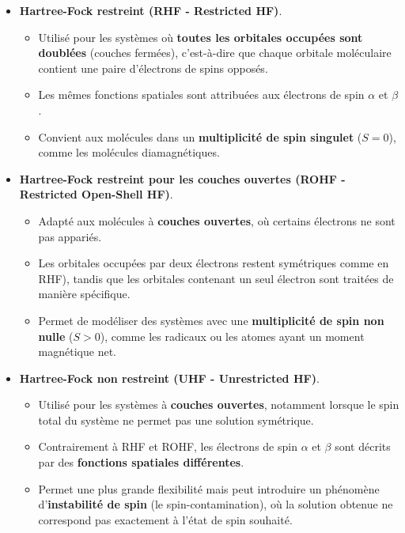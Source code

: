 \documentclass[12pt,a4paper]{article} %
\numberwithin{equation}{section} %
\numberwithin{figure}{section} %
\numberwithin{table}{section} %
\begin{document}
\begin{itemize}
    \item \textbf{Hartree-Fock restreint (RHF - Restricted HF)}.
    \begin{itemize}
        \item Utilisé pour les systèmes où \textbf{toutes les orbitales occupées sont doublées} (couches fermées), c’est-à-dire que chaque orbitale moléculaire contient une paire d’électrons de spins opposés.
        
        \item Les mêmes fonctions spatiales sont attribuées aux électrons de spin $\alpha$ et $\beta$.
        
        \item Convient aux molécules dans un \textbf{multiplicité de spin singulet} ($S = 0$), comme les molécules diamagnétiques.
    \end{itemize}
    
    \item \textbf{Hartree-Fock restreint pour les couches ouvertes (ROHF - Restricted Open-Shell HF)}.
    \begin{itemize}
        \item Adapté aux molécules à \textbf{couches ouvertes}, où certains électrons ne sont pas appariés.
        
        \item Les orbitales occupées par deux électrons restent symétriques comme en RHF), tandis que les orbitales contenant un seul électron sont traitées de manière spécifique.
        
        \item Permet de modéliser des systèmes avec une \textbf{multiplicité de spin non nulle} ($S > 0$),  comme les radicaux ou les atomes ayant un moment magnétique net.
    \end{itemize}

    \item \textbf{Hartree-Fock non restreint (UHF - Unrestricted HF)}.
    \begin{itemize}
        \item Utilisé pour les systèmes à \textbf{couches ouvertes}, notamment lorsque le spin total du système ne permet pas une solution symétrique.
        
        \item Contrairement à RHF et ROHF, les électrons de spin $\alpha$ et $\beta$ sont décrits par des \textbf{fonctions spatiales différentes}.
        
        \item Permet une plus grande flexibilité mais peut introduire un phénomène d’\textbf{instabilité de spin} (le spin-contamination), où la solution obtenue ne correspond pas exactement à l’état de spin souhaité.
    \end{itemize}
\end{itemize}
\end{document}
